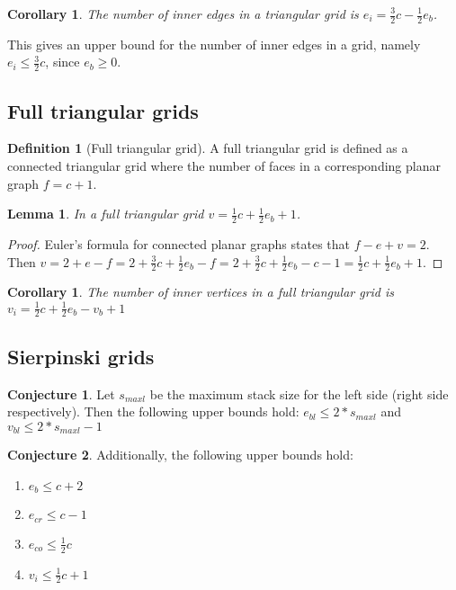 \documentclass{IOS-Book-Article}
\theoremstyle{plain}
\newtheorem{lemma}[theorem]{Lemma}
\newtheorem{corollary}[theorem]{Corollary}
\theoremstyle{definition}
\newtheorem{definition}{Definition}[section]
\newtheorem{conjecture}{Conjecture}[section]
\begin{document}
\begin{corollary} The number of inner edges in a triangular grid is $e_i = \frac{3}{2} c - \frac{1}{2} e_b$. \end{corollary}

This gives an upper bound for the number of inner edges in a grid, namely $e_i \leq \frac{3}{2} c$, since $e_b \geq 0$.

\subsection{Full triangular grids}

\begin{definition} [Full triangular grid]
	A full triangular grid is defined as a connected triangular grid where the number of faces in a corresponding planar graph $f = c + 1$.
\end{definition}

\begin{lemma} \label{lem.vertices} In a full triangular grid $v = \frac{1}{2} c + \frac{1}{2} e_b + 1$. \end{lemma}

\begin{proof}
	Euler's formula for connected planar graphs states that $f - e + v = 2$.
	Then $v = 2 + e - f = 2 + \frac{3}{2} c + \frac{1}{2} e_b - f = 2 + \frac{3}{2} c + \frac{1}{2} e_b - c - 1 = \frac{1}{2} c + \frac{1}{2} e_b + 1$.
\end{proof}

\begin{corollary} The number of inner vertices in a full triangular grid is\\ $v_i = \frac{1}{2} c + \frac{1}{2} e_b - v_b + 1 $ \end{corollary}

\subsection{Sierpinski grids}

\begin{conjecture}
	Let $s_{maxl}$ be the maximum stack size for the left side (right side respectively). Then the following upper bounds hold:
	$e_{bl} \leq 2 * s_{maxl}$ and $v_{bl} \leq 2 * s_{maxl} - 1$
\end{conjecture}

\begin{conjecture} Additionally, the following upper bounds hold:
	\begin{enumerate}
		\item $e_b \leq c + 2$
		\item $e_{cr} \leq c - 1$
		\item $e_{co} \leq \frac{1}{2} c$
		\item $v_i \leq \frac{1}{2} c + 1$
	\end{enumerate}
\end{conjecture}
\end{document}
